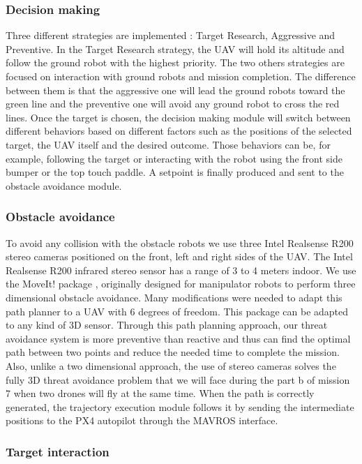 \subsubsection*{Decision making}

Three different strategies are implemented : Target Research, Aggressive and Preventive. In the Target Research strategy, the UAV will hold its altitude and follow the ground robot with the highest priority. The two others strategies are focused on interaction with ground robots and mission completion. The difference between them is that the aggressive one will lead the ground robots toward the green line and the preventive one will avoid any ground robot to cross the red lines. Once the target is chosen, the decision making module will switch between different behaviors based on different factors such as the positions of the selected target, the UAV itself and the desired outcome. Those behaviors can be, for example, following the target or interacting with the robot using the front side bumper or the top touch paddle. A setpoint is finally produced and sent to the obstacle avoidance module.

\subsubsection*{Obstacle avoidance}

To avoid any collision with the obstacle robots we use three Intel Realsense R200 stereo cameras positioned on the front, left and right sides of the UAV. The Intel Realsense R200 infrared stereo sensor has a range of 3 to 4 meters indoor. We use the MoveIt! package \cite{chitta2012ros}, originally designed for manipulator robots to perform three dimensional obstacle avoidance. Many modifications were needed to adapt this path planner to a UAV with 6 degrees of freedom. This package can be adapted to any kind of 3D sensor. Through this path planning approach, our threat avoidance system is more preventive than reactive and thus can find the optimal path between two points and reduce the needed time to complete the mission. Also, unlike a two dimensional approach, the use of stereo cameras solves the fully 3D threat avoidance problem that we will face during the part b of mission 7 when two drones will fly at the same time. When the path is correctly generated, the trajectory execution module follows it by sending the intermediate positions to the PX4 autopilot through the MAVROS interface. 

\subsubsection*{Target interaction}

